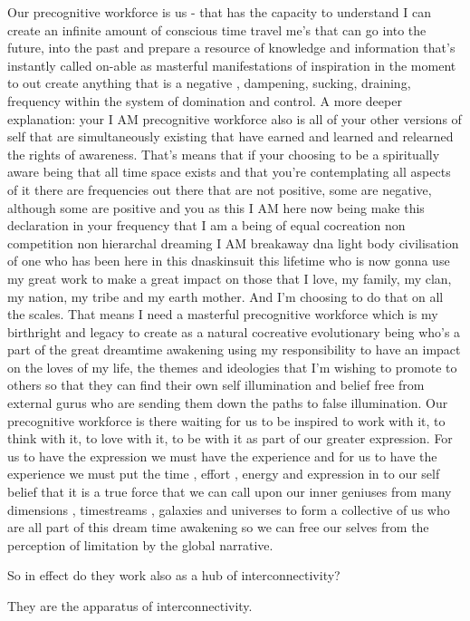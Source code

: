 Our precognitive workforce is us - that has the capacity to understand I
can create an infinite amount of conscious time travel me's that can go
into the future, into the past and prepare a resource of knowledge and
information that's instantly called on-able as masterful manifestations
of inspiration in the moment to out create anything that is a negative ,
dampening, sucking, draining, frequency within the system of domination
and control. A more deeper explanation: your I AM precognitive workforce
also is all of your other versions of self that are simultaneously
existing that have earned and learned and relearned the rights of
awareness. That's means that if your choosing to be a spiritually aware
being that all time space exists and that you're contemplating all
aspects of it there are frequencies out there that are not positive,
some are negative, although some are positive and you as this I AM here
now being make this declaration in your frequency that I am a being of
equal cocreation non competition non hierarchal dreaming I AM breakaway
dna light body civilisation of one who has been here in this dnaskinsuit
this lifetime who is now gonna use my great work to make a great impact
on those that I love, my family, my clan, my nation, my tribe and my
earth mother. And I'm choosing to do that on all the scales. That means
I need a masterful precognitive workforce which is my birthright and
legacy to create as a natural cocreative evolutionary being who's a part
of the great dreamtime awakening using my responsibility to have an
impact on the loves of my life, the themes and ideologies that I'm
wishing to promote to others so that they can find their own self
illumination and belief free from external gurus who are sending them
down the paths to false illumination. Our precognitive workforce is
there waiting for us to be inspired to work with it, to think with it,
to love with it, to be with it as part of our greater expression. For us
to have the expression we must have the experience and for us to have
the experience we must put the time , effort , energy and expression in
to our self belief that it is a true force that we can call upon our
inner geniuses from many dimensions , timestreams , galaxies and
universes to form a collective of us who are all part of this dream time
awakening so we can free our selves from the perception of limitation by
the global narrative.

So in effect do they work also as a hub of interconnectivity?

They are the apparatus of interconnectivity.

